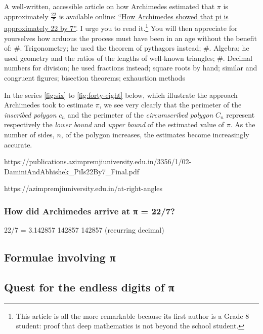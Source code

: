 \documentclass[
  a4paper,
]{article}
\begin{document}
A well-written, accessible article on how Archimedes estimated that
\(\pi\) is approximately \(\frac{22}{7}\) is available online:
\href{https://publications.azimpremjiuniversity.edu.in/3356/1/02-DaminiAndAbhishek_PiIs22By7_Final.pdf}{``How
Archimedes showed that pi is approximately 22 by 7''}. I urge you to
read it.\footnote{This article is all the more remarkable because its
  first author is a Grade 8 student: proof that deep mathematics is not
  beyond the school student.} You will then appreciate for yourselves
how arduous the process must have been in an age without the benefit of:
\#. Trigonometry; he used the theorem of pythagors instead; \#. Algebra;
he used geometry and the ratios of the lengths of well-known triangles;
\#. Decimal numbers for division; he used fractions instead; square
roots by hand; similar and congruent figures; bisection theorems;
exhaustion methods

In the series \cref{fig:six} to \cref{fig:forty-eight} below, which
illustrate the approach Archimedes took to estimate \(\pi\), we see very
clearly that the perimeter of the \emph{inscribed polygon} \(c_n\) and
the perimeter of the \emph{circumscribed polygon} \(C_n\) represent
respectively the \emph{lower bound} and \emph{upper bound} of the
estimated value of \(\pi\). As the number of sides, \(n\), of the
polygon increases, the estimates become increasingly accurate.

https://publications.azimpremjiuniversity.edu.in/3356/1/02-DaminiAndAbhishek\_PiIs22By7\_Final.pdf

https://azimpremjiuniversity.edu.in/at-right-angles

\subsubsection{How did Archimedes arrive at π =
22/7?}\label{how-did-archimedes-arrive-at-ux3c0-227}

22/7 = 3.142857 142857 142857 (recurring decimal)

\subsection{Formulae involving π}\label{formulae-involving-ux3c0}

\subsection{Quest for the endless digits of
π}\label{quest-for-the-endless-digits-of-ux3c0}
\end{document}
